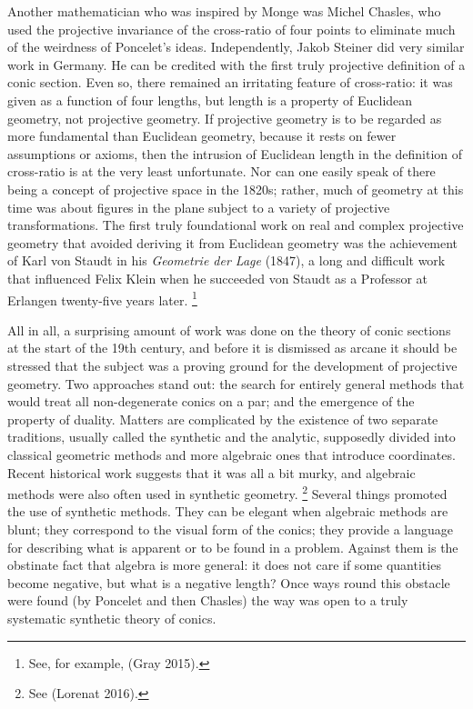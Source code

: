 Another mathematician who was inspired by Monge was Michel Chasles,
%
who used the projective invariance of the cross-ratio of four points
to eliminate much of the weirdness of Poncelet's ideas. Independently,
Jakob Steiner
%
did very similar work in Germany. He can be credited
with the first truly projective definition of a conic section.
%
 Even so,
there remained an irritating feature of cross-ratio:
%
 it was given as a
function of four lengths, but length is a property of Euclidean geometry,
not projective geometry.  If projective geometry is to be regarded as
more fundamental than Euclidean geometry, because it rests on fewer
assumptions or axioms, then the intrusion of Euclidean length in the
definition of cross-ratio is at the very least unfortunate. Nor can one
easily speak of there being a concept of projective space in the 1820s;
rather, much of geometry at this time was about figures in the plane
subject to a variety of projective transformations. The first truly
foundational work on real and complex projective geometry that avoided
deriving it from Euclidean geometry
%
was the achievement of Karl von Staudt
%
in his \emph{Geometrie der Lage} (1847), a long and difficult work that
influenced Felix Klein
%
when he succeeded von Staudt as a Professor at
%
Erlangen twenty-five years later.%
%
\footnote{See, for example, (Gray 2015).}

All in all, a surprising amount of work was done on the theory of conic
sections  at the start of the 19th century, and before it is dismissed
as arcane it should be stressed that the subject was a proving ground
for the development of projective geometry.
%
 Two approaches stand out: the
search for entirely  general methods that would treat all non-degenerate
conics on a par; and the emergence of the property of duality. Matters
%
are complicated by the existence of two separate traditions, usually
called the synthetic
%
%
and the analytic, supposedly divided into classical
geometric methods and more algebraic ones that introduce coordinates.
Recent historical work suggests that it was all a bit murky, and algebraic
methods were also often used in synthetic geometry.%
%
\footnote{See (Lorenat 2016).} 
%
Several things promoted the use of synthetic methods. They can
be elegant when algebraic methods are blunt; they correspond to the
visual form of the conics; they provide a language for describing what
is apparent or to be found in a problem. Against them is the obstinate
fact that algebra is more general: it does not care if some quantities
become negative, but what is a negative length? Once ways round this
obstacle were found (by Poncelet and then Chasles) the way was open to
a truly systematic synthetic theory of conics.

